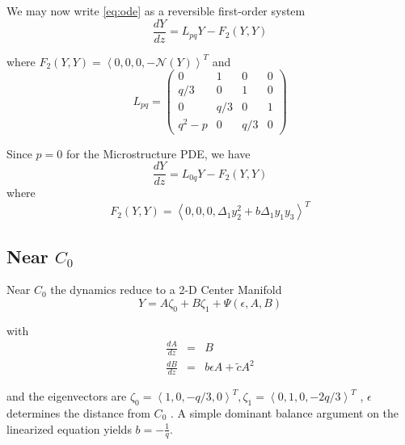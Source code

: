 We may now write \eqref{eq:ode} as a reversible first-order system 
\begin{equation}\frac{ dY }{ dz } = L_{pq} Y - F_2(Y,Y) \end{equation}

where $F_2(Y,Y) = \left<0,0,0,-\mathcal{N}(Y)\right>^T $ and 
\begin{equation}
L_{pq} = \left( 
\begin{array}{cccc}
0&1&0&0\\
q/3&0&1&0\\
0&q/3&0&1\\
q^2 - p &0&q/3&0 \end{array} \right) \end{equation}

Since $p=0$ for the Microstructure PDE, we have 
\begin{equation} 
 \frac{ dY }{ dz } = L_{0q} Y - F_2(Y,Y) 
\end{equation}
where 
\begin{equation}
F_2(Y,Y) = \left<0,0,0,\Delta_1 y_2^2 + b \Delta_1 y_1 y_3 \right>^T
\end{equation}
\subsection{ Near $C_0$ }
Near $C_0$ the dynamics reduce to a 2-D Center Manifold
\begin{equation} Y = A \zeta_0 + B \zeta_1 + \Psi(\epsilon,A,B)
\end{equation}

with 
\begin{subequations}
\begin{eqnarray}
\frac{dA}{dz} &=& B \\
\frac{dB}{dz} &=& b \epsilon A + \tilde{c} A^2
\end{eqnarray}
\end{subequations}


and the eigenvectors are $\zeta_0 = \left<1,0,-q/3,0\right>^T, \zeta_1 = \left<0,1,0,-2 q/3\right>^T $ , $\epsilon$ determines the distance from $C_0$ .
A simple dominant balance argument on the linearized equation yields $b=-\frac{1}{q}$.


